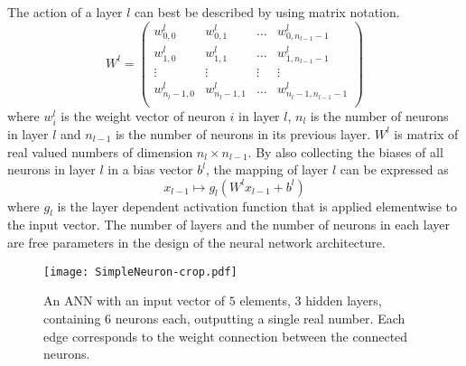 The action of a layer $l$ can best be described by using matrix notation. 
\begin{equation}
W^l = 
\begin{pmatrix}
w_{0,0}^l & w_{0,1}^l & \dots & w_{0,n_{l-1}-1}^l \\
w_{1,0}^l & w_{1,1}^l & \dots & w_{1,n_{l-1}-1}^l \\
\vdots & \vdots & \vdots & \vdots \\
w_{n_l-1,0}^l & w_{n_l-1,1}^l & \dots & w_{n_l-1,n_{l-1}-1}^l \\
\end{pmatrix}
\end{equation}
where $w_i^l$ is the weight vector of neuron $i$ in layer $l$, $n_l$ is the number of neurons in layer $l$ and $n_{l-1}$ is the number of neurons in its previous layer. $W^l$ is matrix of real valued numbers of dimension $n_l \times n_{l-1}$. By also collecting the biases of all neurons in layer $l$ in a bias vector $b^l$, the mapping of layer $l$ can be expressed as%
\begin{equation}
x_{l-1} \mapsto g_l(W^l x_{l-1} + b^l)
\end{equation}
where $g_l$ is the layer dependent activation function that is applied elementwise to the input vector. The number of layers and the number of neurons in each layer are free parameters in the design of the neural network architecture. \\
\begin{figure}[H]
\centering
  \texttt{[image: SimpleNeuron-crop.pdf]}
  \caption{An ANN with an input vector of $5$ elements, $3$ hidden layers, containing $6$ neurons each, outputting a single real number. Each edge corresponds to the weight connection between the connected neurons. }
  \label{fig:ANN}
\end{figure}

